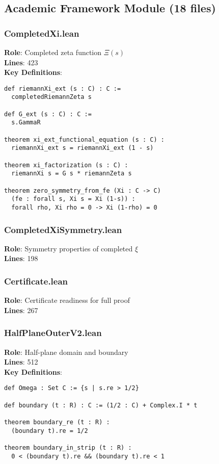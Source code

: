 \subsection{Academic Framework Module (18 files)}

\subsubsection{CompletedXi.lean}
\textbf{Role}: Completed zeta function $\Xi(s)$\\
\textbf{Lines}: 423\\
\textbf{Key Definitions}:
\begin{lstlisting}[language=Lean]
def riemannXi_ext (s : C) : C :=
  completedRiemannZeta s

def G_ext (s : C) : C :=
  s.GammaR

theorem xi_ext_functional_equation (s : C) :
  riemannXi_ext s = riemannXi_ext (1 - s)

theorem xi_factorization (s : C) :
  riemannXi s = G s * riemannZeta s

theorem zero_symmetry_from_fe (Xi : C -> C)
  (fe : forall s, Xi s = Xi (1-s)) :
  forall rho, Xi rho = 0 -> Xi (1-rho) = 0
\end{lstlisting}

\subsubsection{CompletedXiSymmetry.lean}
\textbf{Role}: Symmetry properties of completed $\xi$\\
\textbf{Lines}: 198

\subsubsection{Certificate.lean}
\textbf{Role}: Certificate readiness for full proof\\
\textbf{Lines}: 267

\subsubsection{HalfPlaneOuterV2.lean}
\textbf{Role}: Half-plane domain and boundary\\
\textbf{Lines}: 512\\
\textbf{Key Definitions}:
\begin{lstlisting}[language=Lean]
def Omega : Set C := {s | s.re > 1/2}

def boundary (t : R) : C := (1/2 : C) + Complex.I * t

theorem boundary_re (t : R) :
  (boundary t).re = 1/2

theorem boundary_in_strip (t : R) :
  0 < (boundary t).re && (boundary t).re < 1
\end{lstlisting}

